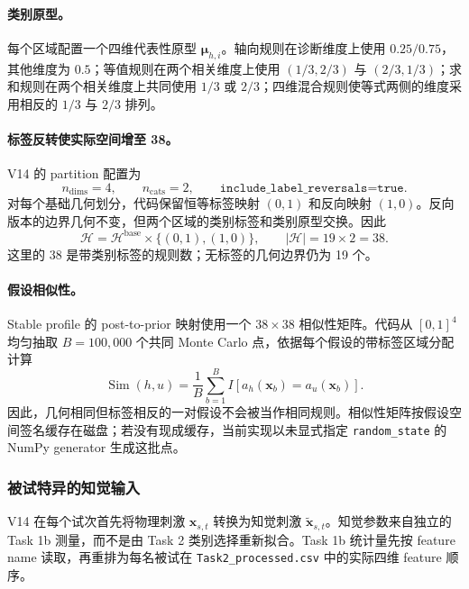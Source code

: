 \paragraph{类别原型。}
每个区域配置一个四维代表性原型 $\bm\mu_{h,i}$。轴向规则在诊断维度上使用 $0.25/0.75$，其他维度为 $0.5$；等值规则在两个相关维度上使用 $(1/3,2/3)$ 与 $(2/3,1/3)$；求和规则在两个相关维度上共同使用 $1/3$ 或 $2/3$；四维混合规则使等式两侧的维度采用相反的 $1/3$ 与 $2/3$ 排列。

\paragraph{标签反转使实际空间增至 38。}
V14 的 partition 配置为
\[
    n_{\mathrm{dims}}=4,\qquad
    n_{\mathrm{cats}}=2,\qquad
    \texttt{include\_label\_reversals=true}.
\]
对每个基础几何划分，代码保留恒等标签映射 $(0,1)$ 和反向映射 $(1,0)$。反向版本的边界几何不变，但两个区域的类别标签和类别原型交换。因此
\begin{equation}
    \mathcal H
    =
    \mathcal H^{\mathrm{base}}
    \times\{(0,1),(1,0)\},
    \qquad
    |\mathcal H|=19\times2=38.
    \label{eq:modelv14-labelled-space}
\end{equation}
这里的 38 是带类别标签的规则数；无标签的几何边界仍为 19 个。

\paragraph{假设相似性。}
Stable profile 的 post-to-prior 映射使用一个 $38\times38$ 相似性矩阵。代码从 $[0,1]^4$ 均匀抽取 $B=100{,}000$ 个共同 Monte Carlo 点，依据每个假设的带标签区域分配计算
\begin{equation}
    \operatorname{Sim}(h,u)
    =
    \frac{1}{B}
    \sum_{b=1}^{B}
    I\!\left[
        a_h(\mathbf x_b)=a_u(\mathbf x_b)
    \right].
    \label{eq:modelv14-similarity}
\end{equation}
因此，几何相同但标签相反的一对假设不会被当作相同规则。相似性矩阵按假设空间签名缓存在磁盘；若没有现成缓存，当前实现以未显式指定 \texttt{random\_state} 的 NumPy generator 生成这批点。


\subsubsection{被试特异的知觉输入}

V14 在每个试次首先将物理刺激 $\mathbf x_{s,t}$ 转换为知觉刺激 $\widetilde{\mathbf x}_{s,t}$。知觉参数来自独立的 Task 1b 测量，而不是由 Task 2 类别选择重新拟合。Task 1b 统计量先按 feature name 读取，再重排为每名被试在 \texttt{Task2\_processed.csv} 中的实际四维 feature 顺序。

